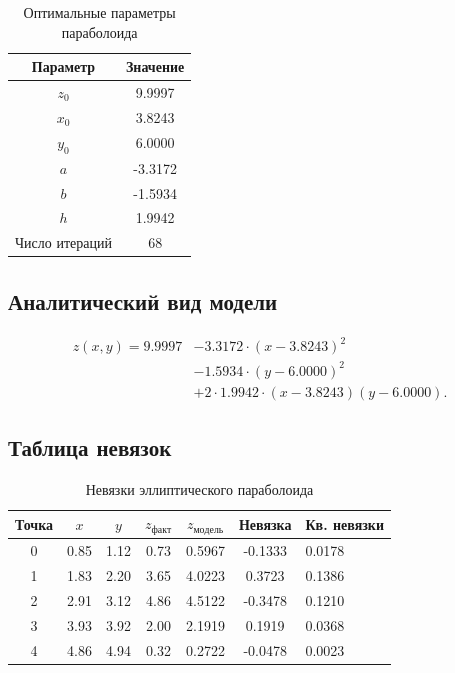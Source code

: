 \begin{table}[H]
    \centering
    \caption{Оптимальные параметры параболоида}
    \label{tab:parab_params}
    \begin{tabular}{|c|c|}
        \hline
        \textbf{Параметр} & \textbf{Значение} \\
        \hline
        $z_0$ & 9.9997 \\
        $x_0$ & 3.8243 \\
        $y_0$ & 6.0000 \\
        $a$ & -3.3172 \\
        $b$ & -1.5934 \\
        $h$ & 1.9942 \\
        \hline
        Число итераций & 68 \\
        \hline
    \end{tabular}
\end{table}

\subsection{Аналитический вид модели}

\begin{equation}\label{eq:parab_result}
    \begin{aligned}
        z(x,y) = 9.9997 &- 3.3172 \cdot (x - 3.8243)^2 \\
                         &- 1.5934 \cdot (y - 6.0000)^2 \\
                         &+ 2 \cdot 1.9942 \cdot (x - 3.8243)(y - 6.0000).
    \end{aligned}
\end{equation}

\subsection{Таблица невязок}

\begin{table}[H]
    \centering
    \caption{Невязки эллиптического параболоида}
    \label{tab:parab_residuals}
    \begin{tabular}{|c|c|c|c|c|c|}
        \hline
        \textbf{Точка} & \textbf{$x$} & \textbf{$y$} & \textbf{$z_{факт}$} & \textbf{$z_{модель}$} & \textbf{Невязка} & \textbf{Кв. невязки} \\
         & 0.85 & 1.12 & 0.73 & 0.5967 & -0.1333 & 0.0178 \\
        1 & 1.83 & 2.20 & 3.65 & 4.0223 & 0.3723 & 0.1386 \\
        2 & 2.91 & 3.12 & 4.86 & 4.5122 & -0.3478 & 0.1210 \\
        3 & 3.93 & 3.92 & 2.00 & 2.1919 & 0.1919 & 0.0368 \\
        4 & 4.86 & 4.94 & 0.32 & 0.2722 & -0.0478 & 0.0023 \\
        \hline
    \end{tabular}
\end{table}

